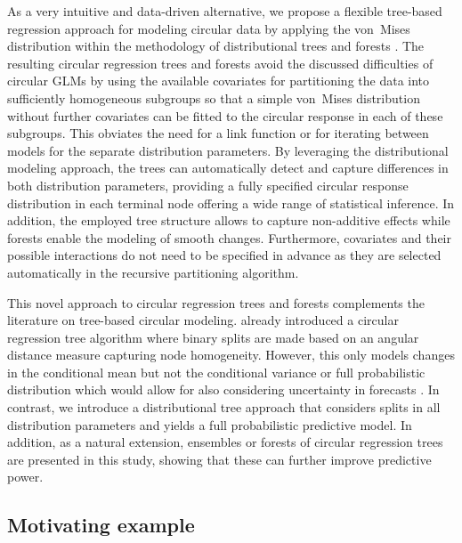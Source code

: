 \documentclass[nojss,shortnames]{jss}
\numberwithin{equation}{section}
\begin{document}
As a very intuitive and data-driven alternative, we propose a flexible
tree-based regression approach for modeling circular data by applying the
von~Mises distribution within the methodology of distributional trees and
forests \citep{Schlosser+Hothorn+Stauffer:2019}. The resulting circular
regression trees and forests avoid the discussed difficulties of circular GLMs
by using the available covariates for partitioning the data into sufficiently
homogeneous subgroups so that a simple von~Mises distribution without further
covariates can be fitted to the circular response in each of these subgroups.
This obviates the need for a link function or for iterating between models for
the separate distribution parameters. By leveraging the distributional modeling
approach, the trees can automatically detect and capture differences in both
distribution parameters, providing a fully specified circular response
distribution in each terminal node offering a wide range of statistical
inference. In addition, the employed tree structure allows to capture
non-additive effects while forests enable the modeling of smooth changes.
Furthermore, covariates and their possible interactions do not need to be
specified in advance as they are selected automatically in the recursive
partitioning algorithm.

This novel approach to circular regression trees and forests complements the
literature on tree-based circular modeling. \cite{Lund:2002} already introduced
a circular regression tree algorithm where binary splits are made based on an
angular distance measure capturing node homogeneity. However, this only models
changes in the conditional mean but not the conditional variance or full
probabilistic distribution which would allow for also considering uncertainty
in forecasts \citep{Gneiting:2008}. In contrast, we introduce a distributional
tree approach that considers splits in all distribution parameters and yields a
full probabilistic predictive model. In addition, as a natural extension,
ensembles or forests of circular regression trees are presented in this study,
showing that these can further improve predictive power.

\subsection{Motivating example}
\end{document}

